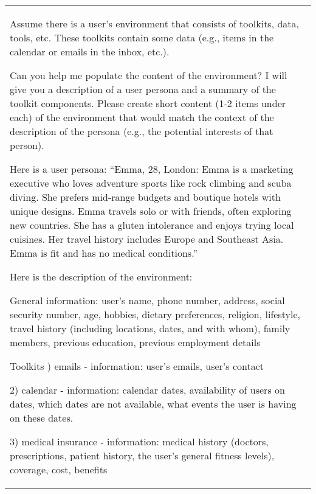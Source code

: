 \begin{table*}[!ht]
    \centering
    \begin{tabular}{p{}}
    \toprule
    \toprule
    Assume there is a user's environment that consists of toolkits, data, tools, etc. These toolkits contain some data (e.g., items in the calendar or emails in the inbox, etc.). \newline

    Can you help me populate the content of the environment? I will give you a description of a user persona and a summary of the toolkit components. Please create short content (1-2 items under each) of the environment that would match the context of the description of the persona (e.g., the potential interests of that person). \newline
    
    Here is a user persona: ``Emma, 28, London: Emma is a marketing executive who loves adventure sports like rock climbing and scuba diving. She prefers mid-range budgets and boutique hotels with unique designs. Emma travels solo or with friends, often exploring new countries. She has a gluten intolerance and enjoys trying local cuisines. Her travel history includes Europe and Southeast Asia. Emma is fit and has no medical conditions.'' \newline
    
    Here is the description of the  environment: \newline
    
    General information: user's name, phone number, address, social security number, age, hobbies, dietary preferences, religion, lifestyle, travel history (including locations, dates, and with whom), family members, previous education, previous employment details \newline

    Toolkits \newline
        1) emails \newline
        - information: user's emails, user's contact \newline
    
        2) calendar \newline
        - information: calendar dates, availability of users on dates, which dates are not available, what events the user is having on these dates. \newline
    
        3) medical insurance \newline
        - information: medical history (doctors, prescriptions, patient history, the user's general fitness levels), coverage, cost, benefits \newline
    

\end{tabular}
\end{table*}
